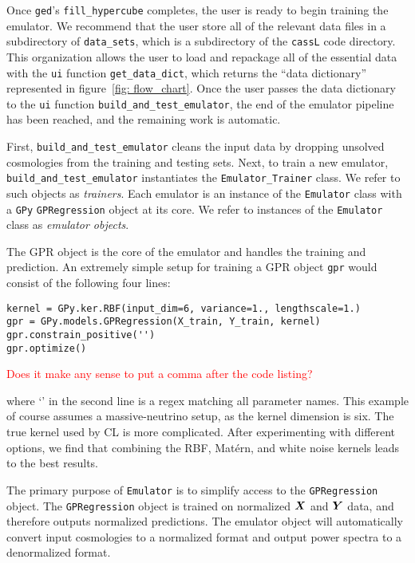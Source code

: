 
Once \texttt{ged}'s \verb|fill_hypercube| completes, the user is ready to
begin training the emulator. We recommend that the user store all of the
relevant data files in a subdirectory of \verb|data_sets|, which is a
subdirectory of the \texttt{cassL} code directory. This organization
allows the user to load and repackage all of the essential data with the
\texttt{ui} function \verb|get_data_dict|, which returns the
``data dictionary'' represented in figure~\ref{fig: flow_chart}.
Once the user passes the data dictionary to the \texttt{ui} function
\verb|build_and_test_emulator|, the end of the emulator pipeline has been 
reached, and the remaining work is automatic.

First, \verb|build_and_test_emulator| cleans the input data by dropping
unsolved cosmologies from the training and testing sets. Next, to train a new 
emulator, \\
\verb|build_and_test_emulator| instantiates the
\verb|Emulator_Trainer| class. We refer to such objects as \textit{trainers}.
Each emulator is an instance of
the \texttt{Emulator} class with a \texttt{GPy}
\texttt{GPRegression} object at its core. We 
refer to instances of the \texttt{Emulator} class as \textit{emulator 
objects}.

The GPR object is the core of the emulator and handles the training
and prediction. An extremely simple setup for training a GPR object
\texttt{gpr} would consist of the following four lines:

\begin{verbatim}
kernel = GPy.ker.RBF(input_dim=6, variance=1., lengthscale=1.)
gpr = GPy.models.GPRegression(X_train, Y_train, kernel)
gpr.constrain_positive('')
gpr.optimize()
\end{verbatim}

\textcolor{red}{Does it make any sense to put a comma after the code listing?}

where `' in the second line is a regex matching all parameter names. This
example of course assumes a massive-neutrino setup, as the kernel dimension is
six. The true kernel used by CL is more complicated. After experimenting with
different options, we find that combining the RBF, Mat\'{e}rn, and white noise
kernels leads to the best results.

The primary purpose of \texttt{Emulator} is to simplify access to the
\texttt{GPRegression} object. The \texttt{GPRegression} object is trained on
normalized $\bm{X}$ and $\bm{Y}$ data, and therefore outputs normalized
predictions. The emulator object will automatically convert input cosmologies
to a normalized format and output power spectra to a denormalized format.

